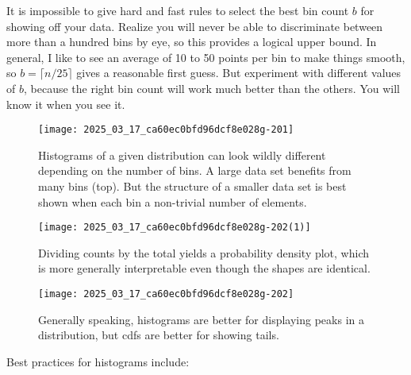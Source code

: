 \documentclass[10pt]{article}
\begin{document}
It is impossible to give hard and fast rules to select the best bin count $b$ for showing off your data. Realize you will never be able to discriminate between more than a hundred bins by eye, so this provides a logical upper bound. In general, I like to see an average of 10 to 50 points per bin to make things smooth, so $b = \lceil n / 25 \rceil$ gives a reasonable first guess. But experiment with different values of $b$, because the right bin count will work much better than the others. You will know it when you see it.

\begin{figure}[h]
\centering
\texttt{[image: 2025\_03\_17\_ca60ec0bfd96dcf8e028g-201]}
\caption{Histograms of a given distribution can look wildly different depending on the number of bins. A large data set benefits from many bins (top). But the structure of a smaller data set is best shown when each bin a non-trivial number of elements.}
\end{figure}

\begin{figure}[h]
\centering
\texttt{[image: 2025\_03\_17\_ca60ec0bfd96dcf8e028g-202(1)]}
\caption{Dividing counts by the total yields a probability density plot, which is more generally interpretable even though the shapes are identical.}
\end{figure}

\begin{figure}[h]
\centering
\texttt{[image: 2025\_03\_17\_ca60ec0bfd96dcf8e028g-202]}
\caption{Generally speaking, histograms are better for displaying peaks in a distribution, but cdfs are better for showing tails.}
\end{figure}

Best practices for histograms include:
\end{document}
